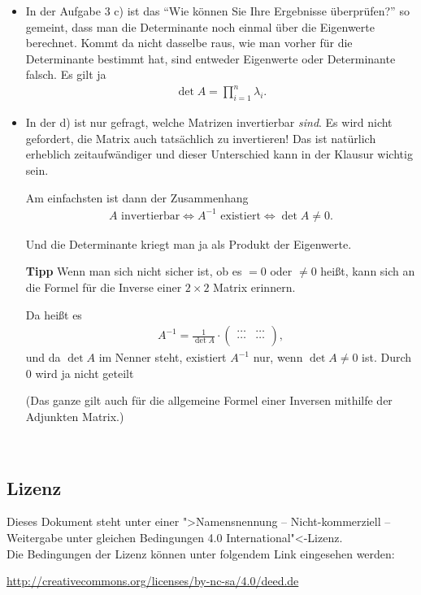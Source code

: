 \documentclass[11pt, a4paper]{article}
\begin{document}
\begin{itemize}
\item In der Aufgabe 3 c) ist das \enquote{Wie können Sie Ihre Ergebnisse überprüfen?} so gemeint, dass man die Determinante noch einmal über die Eigenwerte berechnet. Kommt da nicht dasselbe raus, wie man vorher für die Determinante bestimmt hat, sind entweder Eigenwerte oder Determinante falsch. Es gilt ja
\begin{align*}
\det A = \prod_{i=1}^n \lambda_i.
\end{align*}

\item In der d) ist nur gefragt, welche Matrizen invertierbar \emph{sind}. Es wird nicht gefordert, die Matrix auch tatsächlich zu invertieren! Das ist natürlich erheblich zeitaufwändiger und dieser Unterschied kann in der Klausur wichtig sein. 

Am einfachsten ist dann der Zusammenhang 
\begin{align*}
A \text{~invertierbar} \Leftrightarrow A^{-1} \text{~existiert} \Leftrightarrow \det A \neq 0.
\end{align*}

Und die Determinante kriegt man ja als Produkt der Eigenwerte. 

\textbf{Tipp} Wenn man sich nicht sicher ist, ob es $= 0$ oder $\neq 0$ heißt, kann sich an die Formel für die Inverse einer $2 \times 2$ Matrix erinnern.

Da heißt es
\begin{align*}
A^{-1} = \frac{1}{\det A} \cdot 
\left(
\begin{array}{cc}
\dots & \dots\\ 
\dots & \dots\\
\end{array}
\right),
\end{align*}
und da $\det A$ im Nenner steht, existiert $A^{-1}$ nur, wenn $\det A \neq 0$ ist. Durch $0$ wird ja nicht geteilt \smiley{}

(Das ganze gilt auch für die allgemeine Formel einer Inversen mithilfe der Adjunkten Matrix.)
\end{itemize}




\newpage
~
\vfill
{\footnotesize
\subsection*{Lizenz}
Dieses Dokument steht unter einer ">Namensnennung -- Nicht-kommerziell -- Weitergabe unter gleichen Bedingungen 4.0 International"<-Lizenz.\\

\noindent
Die Bedingungen der Lizenz können unter folgendem Link eingesehen werden: 

\noindent
\url{http://creativecommons.org/licenses/by-nc-sa/4.0/deed.de}}
\end{document}
